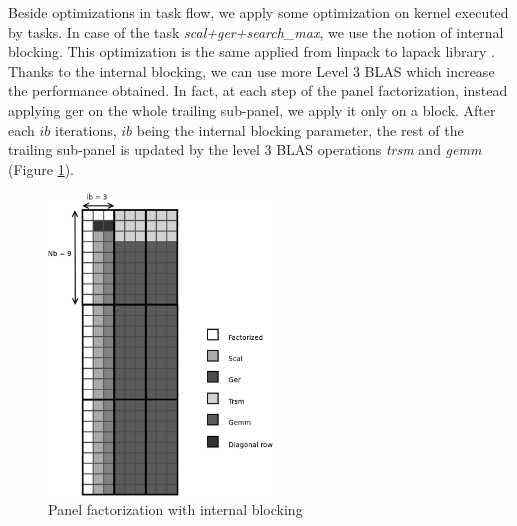 Beside optimizations in task flow, we apply some optimization on kernel executed by tasks. In case of the task \textit{scal+ger+search\_max}, we use the notion of internal blocking. This optimization is the same applied from linpack to lapack library \cite{Anderson:1990:LPL}. Thanks to the internal blocking, we can use more Level 3 BLAS which increase the performance obtained. In fact, at each step of the panel factorization, instead applying ger on the whole trailing sub-panel, we apply it only on a block. After each $ib$ iterations, $ib$ being the internal blocking parameter, the rest of the trailing sub-panel is updated by the level 3 BLAS operations \textit{trsm} and \textit{gemm} (Figure \ref{fig:panel_ib}).

\begin{figure}[!ht]
\centering
\includegraphics[height=8cm]{figures/panel_ib_bw.pdf}
\caption{Panel factorization with internal blocking\label{fig:panel_ib}}
\end{figure}
